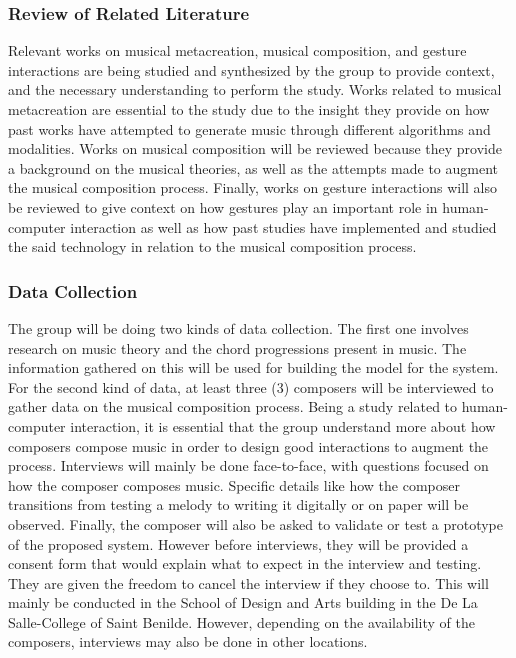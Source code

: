 \subsubsection{Review of Related Literature}
Relevant works on musical metacreation, musical composition, and gesture interactions are being studied and synthesized by the group to provide context, and the necessary understanding to perform the study. Works related to musical metacreation are essential to the study due to the insight they provide on how past works have attempted to generate music through different algorithms and modalities. Works on musical composition will be reviewed because they provide a background on the musical theories, as well as the attempts made to augment the musical composition process. Finally, works on gesture interactions will also be reviewed to give context on how gestures play an important role in human-computer interaction as well as how past studies have implemented and studied the said technology in relation to the musical composition process.

\subsubsection{Data Collection}
The group will be doing two kinds of data collection. The first one involves research on music theory and the chord progressions present in music. The information gathered on this will be used for building the model for the system. For the second kind of data, at least three (3) composers will be interviewed to gather data on the musical composition process. Being a study related to human-computer interaction, it is essential that the group understand more about how composers compose music in order to design good interactions to augment the process. Interviews will mainly be done face-to-face, with questions focused on how the composer composes music. Specific details like how the composer transitions from testing a melody to writing it digitally or on paper will be observed. Finally, the composer will also be asked to validate or test a prototype of the proposed system. However before interviews, they will be provided a consent form that would explain what to expect in the interview and testing. They are given the freedom to cancel the interview if they choose to. This will mainly be conducted in the School of Design and Arts building in the De La Salle-College of Saint Benilde. However, depending on the availability of the composers, interviews may also be done in other locations. 

